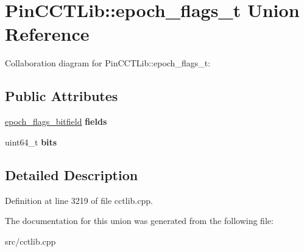\hypertarget{unionPinCCTLib_1_1epoch__flags__t}{\section{Pin\-C\-C\-T\-Lib\-:\-:epoch\-\_\-flags\-\_\-t Union Reference}
\label{unionPinCCTLib_1_1epoch__flags__t}
}


Collaboration diagram for Pin\-C\-C\-T\-Lib\-:\-:epoch\-\_\-flags\-\_\-t\-:
\subsection*{Public Attributes}
\begin{DoxyCompactItemize}
\item 
\hypertarget{unionPinCCTLib_1_1epoch__flags__t_aa6f14e744b98403a0fdb444c2fb2b6d1}{\hyperlink{structPinCCTLib_1_1epoch__flags__bitfield}{epoch\-\_\-flags\-\_\-bitfield} {\bfseries fields}}\label{unionPinCCTLib_1_1epoch__flags__t_aa6f14e744b98403a0fdb444c2fb2b6d1}

\item 
\hypertarget{unionPinCCTLib_1_1epoch__flags__t_afbc7d2d89f89835387d90fd8a0aa78d2}{uint64\-\_\-t {\bfseries bits}}\label{unionPinCCTLib_1_1epoch__flags__t_afbc7d2d89f89835387d90fd8a0aa78d2}

\end{DoxyCompactItemize}


\subsection{Detailed Description}


Definition at line 3219 of file cctlib.\-cpp.



The documentation for this union was generated from the following file\-:\begin{DoxyCompactItemize}
\item 
src/cctlib.\-cpp\end{DoxyCompactItemize}
